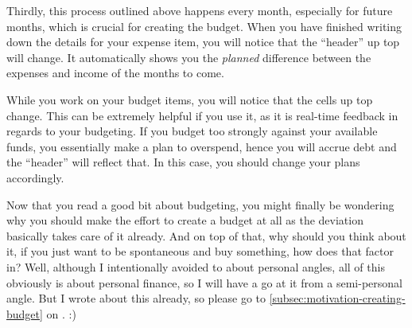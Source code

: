 Thirdly, this process outlined above happens every month, especially for future months, which is crucial for creating the budget.
When you have finished writing down the details for your expense item, you will notice that the ``header'' up top will change.
It automatically shows you the \emph{planned} difference between the expenses and income of the months to come.
\begin{specialnote}
	While you work on your budget items, you will notice that the cells up top change.
	This can be extremely helpful if you use it, as it is real-time feedback in regards to your budgeting.
	If you budget too strongly against your available funds, you essentially make a plan to overspend, hence you will accrue debt and the ``header'' will reflect that.
	In this case, you should change your plans accordingly.
\end{specialnote}

Now that you read a good bit about budgeting, you might finally be wondering why you should make the effort to create a budget at all as the deviation basically takes care of it already.
And on top of that, why should you think about it, if you just want to be spontaneous and buy something, how does that factor in?
Well, although I intentionally avoided to about personal angles, all of this obviously is about personal finance, so I will have a go at it from a semi-personal angle.
But I wrote about this already, so please go to \autoref{subsec:motivation-creating-budget} on . :)